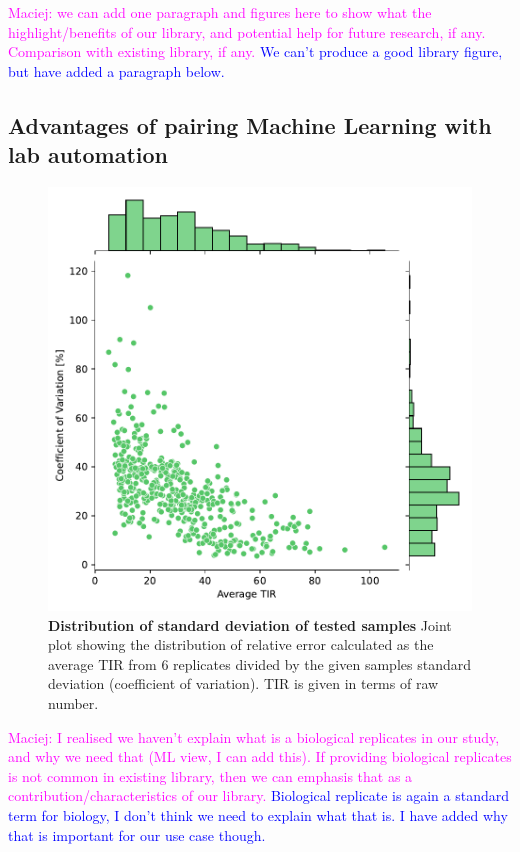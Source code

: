 \documentclass{article}
\newcommand{\mengyan}[1]{\textcolor{magenta}{#1}}
\newcommand{\maciej}[1]{\textcolor{blue}{#1}}
\begin{document}
\mengyan{Maciej: we can add one paragraph and figures here to show what the highlight/benefits of our library, and potential help for future research, if any. Comparison with existing library, if any.} \maciej{We can't produce a good library figure, but have added a paragraph below.}

\subsection{Advantages of pairing Machine Learning with lab automation}

\begin{figure}[!ht]
    \centering
    \includegraphics[scale=0.75]{plots/Main_Paper/SD.pdf}
    \caption{\textbf{Distribution of standard deviation of tested samples} Joint plot showing the distribution of relative error calculated as the average TIR from 6 replicates divided by the given samples standard deviation (coefficient of variation). TIR is given in terms of raw number.}
    \label{fig: SD}
\end{figure}

\mengyan{Maciej: I realised we haven't explain what is a biological replicates in our study, and why we need that (ML view, I can add this). If providing biological replicates is not common in existing library, then we can emphasis that as a contribution/characteristics of our library.}
\maciej{Biological replicate is again a standard term for biology, I don't think we need to explain what that is. I have added why that is important for our use case though.}
\end{document}
